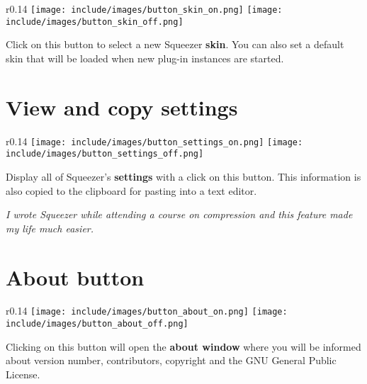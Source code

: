 \begin{wrapfigure}{r}{0.14\linewidth}
  \texttt{[image: include/images/button\_skin\_on.png]}
  \newline \vspace{-0.9\baselineskip}
  \texttt{[image: include/images/button\_skin\_off.png]}
\end{wrapfigure}

Click on this button to select a new Squeezer \textbf{skin}.  You can
also set a default skin that will be loaded when new plug-in instances
are started.

\newpage %

\section{View and copy settings}

\begin{wrapfigure}{r}{0.14\linewidth}
  \texttt{[image: include/images/button\_settings\_on.png]}
  \newline \vspace{-0.9\baselineskip}
  \texttt{[image: include/images/button\_settings\_off.png]}
\end{wrapfigure}

Display all of Squeezer's \textbf{settings} with a click on this
button.  This information is also copied to the clipboard for pasting
into a text editor.

\emph{I wrote Squeezer while attending a course on compression and
  this feature made my life much easier.}

\section{About button}

\begin{wrapfigure}{r}{0.14\linewidth}
  \texttt{[image: include/images/button\_about\_on.png]}
  \newline \vspace{-0.9\baselineskip}
  \texttt{[image: include/images/button\_about\_off.png]}
\end{wrapfigure}

Clicking on this button will open the \textbf{about window} where you
will be informed about version number, contributors, copyright and the
GNU General Public License.

